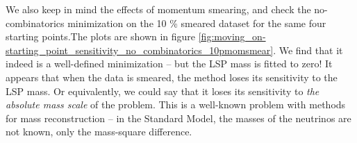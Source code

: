 \documentclass[twoside,english]{uiofysmaster}
\begin{document}


We also keep in mind the effects of momentum smearing, and check the no-combinatorics minimization on the 10 \% smeared dataset for the same four starting points.The plots are shown in figure \ref{fig:moving_on-starting_point_sensitivity_no_combinatorics_10pmomsmear}. We find that it indeed is a well-defined minimization -- but the LSP mass is fitted to zero! It appears that when the data is smeared, the method loses its sensitivity to the LSP mass. Or equivalently, we could say that it loses its sensitivity to {\it the absolute mass scale} of the problem. This is a well-known problem with methods for mass reconstruction -- in the Standard Model, the masses of the neutrinos are not known, only the mass-square difference. 
\end{document}
